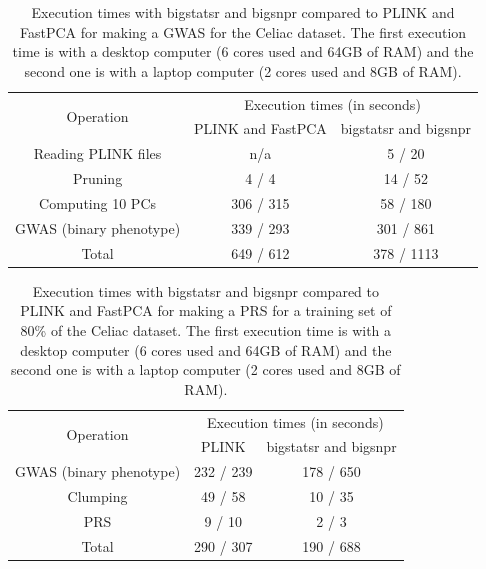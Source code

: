 \documentclass{bioinfo}
\begin{document}
\begin{table}[!tpb]
\centering
\begin{adjustbox}{max width=235pt}
\begin{tabular}{|c|c|c|}
\hline
\multirow{2}{*}{Operation} &   \multicolumn{2}{|c|}{Execution times (in seconds)} \\
 \cline{2-3}
 & PLINK and FastPCA & bigstatsr and bigsnpr \\
\hline
Reading PLINK files & n/a & 5 / 20 \\
Pruning & 4 / 4 & 14 / 52 \\
Computing 10 PCs & 306 / 315 & 58 / 180 \\
GWAS (binary phenotype) & 339 / 293 & 301 / 861 \\
\hline
Total & 649 / 612 & 378 / 1113 \\
\hline
\end{tabular} 
\end{adjustbox}
\caption{Execution times with bigstatsr and bigsnpr compared to PLINK and FastPCA for making a GWAS for the Celiac dataset. The first execution time is with a desktop computer (6 cores used and 64GB of RAM) and the second one is with a laptop computer (2 cores used and 8GB of RAM).} 
\label{tab:bench-gwas}
\end{table}

\begin{table}[!tpb]
\centering
\begin{adjustbox}{max width=235pt}
\begin{tabular}{|c|c|c|}
\hline
\multirow{2}{*}{Operation} &   \multicolumn{2}{|c|}{Execution times (in seconds)} \\
 \cline{2-3}
 & PLINK & bigstatsr and bigsnpr \\
\hline
GWAS (binary phenotype) & 232 / 239 & 178 / 650  \\
Clumping & 49 / 58 & 10 / 35 \\
PRS & 9 / 10 & 2 / 3 \\
\hline
Total & 290 / 307 & 190 / 688 \\
\hline
\end{tabular} 
\end{adjustbox}
\caption{Execution times with bigstatsr and bigsnpr compared to PLINK and FastPCA for making a PRS for a training set of 80\% of the Celiac dataset. The first execution time is with a desktop computer (6 cores used and 64GB of RAM) and the second one is with a laptop computer (2 cores used and 8GB of RAM).}
\label{tab:bench-prs}
\end{table}
\end{document}
